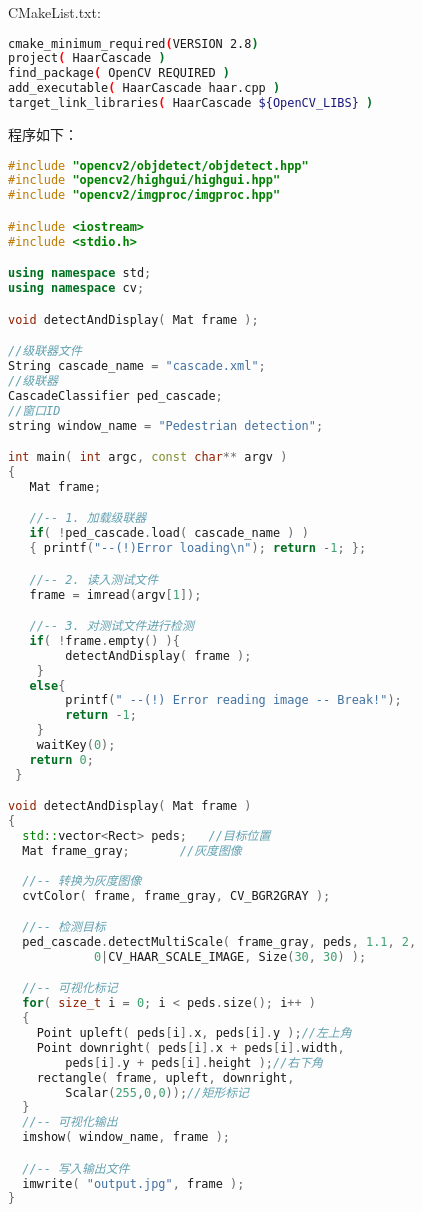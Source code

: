\documentclass[10pt,technote]{IEEEtran}
\begin{document}
CMakeList.txt:
\begin{lstlisting}[language=bash]
cmake_minimum_required(VERSION 2.8)
project( HaarCascade )
find_package( OpenCV REQUIRED )
add_executable( HaarCascade haar.cpp )
target_link_libraries( HaarCascade ${OpenCV_LIBS} )
\end{lstlisting}
程序如下：
\begin{lstlisting}[language=C++]
#include "opencv2/objdetect/objdetect.hpp"
#include "opencv2/highgui/highgui.hpp"
#include "opencv2/imgproc/imgproc.hpp"

#include <iostream>
#include <stdio.h>

using namespace std;
using namespace cv;

void detectAndDisplay( Mat frame );

//级联器文件
String cascade_name = "cascade.xml";   
//级联器
CascadeClassifier ped_cascade;			
//窗口ID
string window_name = "Pedestrian detection";		

int main( int argc, const char** argv )
{
   Mat frame;

   //-- 1. 加载级联器
   if( !ped_cascade.load( cascade_name ) )
   { printf("--(!)Error loading\n"); return -1; };

   //-- 2. 读入测试文件
   frame = imread(argv[1]);

   //-- 3. 对测试文件进行检测
   if( !frame.empty() ){ 
		detectAndDisplay( frame ); 
	}
   else{ 
		printf(" --(!) Error reading image -- Break!"); 
		return -1; 
	}
	waitKey(0);
   return 0;
 }

void detectAndDisplay( Mat frame )
{
  std::vector<Rect> peds;	//目标位置
  Mat frame_gray;		//灰度图像
  
  //-- 转换为灰度图像
  cvtColor( frame, frame_gray, CV_BGR2GRAY );	

  //-- 检测目标
  ped_cascade.detectMultiScale( frame_gray, peds, 1.1, 2, 
  			0|CV_HAAR_SCALE_IMAGE, Size(30, 30) );

  //-- 可视化标记
  for( size_t i = 0; i < peds.size(); i++ )
  {
    Point upleft( peds[i].x, peds[i].y );//左上角
    Point downright( peds[i].x + peds[i].width, 
		peds[i].y + peds[i].height );//右下角
    rectangle( frame, upleft, downright,
		Scalar(255,0,0));//矩形标记
  }
  //-- 可视化输出
  imshow( window_name, frame );

  //-- 写入输出文件
  imwrite( "output.jpg", frame );
}
\end{lstlisting}

\end{document}
